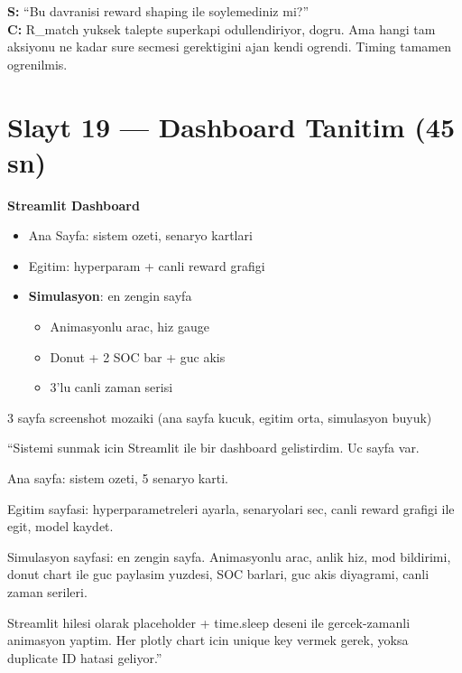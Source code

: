 \documentclass[11pt,a4paper]{article}
\begin{document}
\begin{soruboks}
\textbf{S:} ``Bu davranisi reward shaping ile soylemediniz mi?''\\
\textbf{C:} R\_match yuksek talepte superkapi odullendiriyor, dogru. Ama hangi tam aksiyonu ne kadar sure secmesi gerektigini ajan kendi ogrendi. Timing tamamen ogrenilmis.
\end{soruboks}

\section{Slayt 19 --- Dashboard Tanitim (45 sn)}

\begin{slytboks}
\textbf{Streamlit Dashboard}
\begin{itemize}
\item Ana Sayfa: sistem ozeti, senaryo kartlari
\item Egitim: hyperparam + canli reward grafigi
\item \textbf{Simulasyon}: en zengin sayfa
  \begin{itemize}
  \item Animasyonlu arac, hiz gauge
  \item Donut + 2 SOC bar + guc akis
  \item 3'lu canli zaman serisi
  \end{itemize}
\end{itemize}
\end{slytboks}

\begin{gorselboks}
3 sayfa screenshot mozaiki (ana sayfa kucuk, egitim orta, simulasyon buyuk)
\end{gorselboks}

\begin{sayboks}
``Sistemi sunmak icin Streamlit ile bir dashboard gelistirdim. Uc sayfa var.

Ana sayfa: sistem ozeti, 5 senaryo karti.

Egitim sayfasi: hyperparametreleri ayarla, senaryolari sec, canli reward grafigi ile egit, model kaydet.

Simulasyon sayfasi: en zengin sayfa. Animasyonlu arac, anlik hiz, mod bildirimi, donut chart ile guc paylasim yuzdesi, SOC barlari, guc akis diyagrami, canli zaman serileri.

Streamlit hilesi olarak placeholder + time.sleep deseni ile gercek-zamanli animasyon yaptim. Her plotly chart icin unique key vermek gerek, yoksa duplicate ID hatasi geliyor.''
\end{sayboks}
\end{document}
